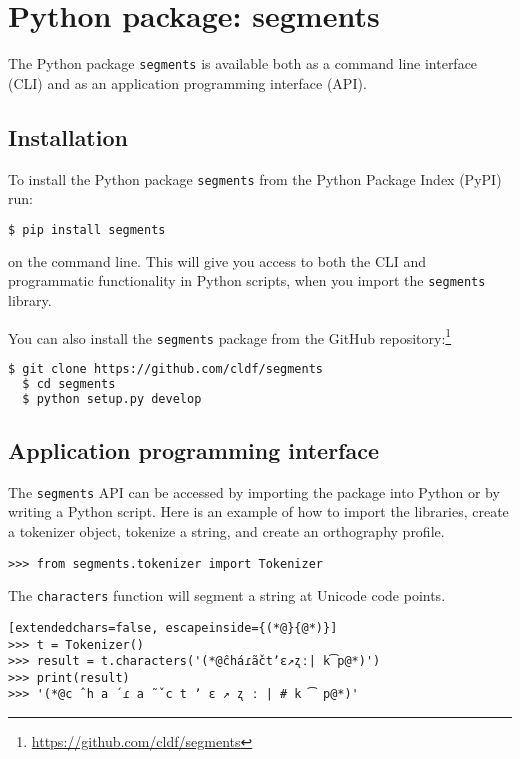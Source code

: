 \section{Python package: segments}
\label{python-implementations}

The Python package \texttt{segments} is available both as a command line interface (CLI) and as an application programming interface (API).

\subsection*{Installation}

To install the Python package \texttt{segments} \citep{ForkelMoran2018} from the Python Package Index (PyPI) run:

\begin{lstlisting}[language=bash]
  $ pip install segments
\end{lstlisting}

\noindent on the command line. This will give you access to both the CLI and programmatic functionality in Python scripts, when you import the \texttt{segments} library.

You can also install the \texttt{segments} package from the GitHub repository:\footnote{\url{https://github.com/cldf/segments}}

\begin{lstlisting}[language=bash]
  $ git clone https://github.com/cldf/segments
  $ cd segments
  $ python setup.py develop
\end{lstlisting}

\subsection*{Application programming interface}
The \texttt{segments} API can be accessed by importing the package into Python or by writing a Python script. Here is an example of how to import the libraries, create a tokenizer object, tokenize a string, and create an orthography profile.

\begin{lstlisting}
>>> from segments.tokenizer import Tokenizer
\end{lstlisting}

\noindent The \texttt{characters} function will segment a string at Unicode code points.

\begin{lstlisting}[extendedchars=false, escapeinside={(*@}{@*)}]
>>> t = Tokenizer()
>>> result = t.characters('(*@ĉháɾã̌ctʼɛ↗ʐː| k͡p@*)')
>>> print(result)
>>> '(*@c ̂ h a ́ ɾ a ̃ ̌ c t ʼ ɛ ↗ ʐ ː | # k ͡ p@*)'
\end{lstlisting}


